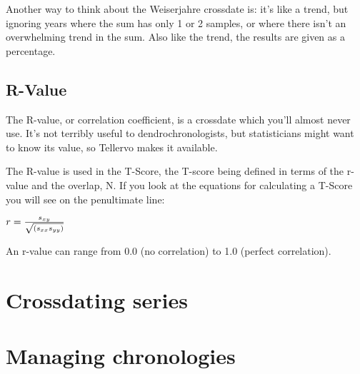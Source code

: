 Another way to think about the Weiserjahre crossdate is: it's like a trend, but ignoring years where the sum has only 1 or 2 samples, or where there isn't an overwhelming trend in the sum. Also like the trend, the results are given as a percentage.


\subsection{R-Value}
The R-value, or correlation coefficient, is a crossdate which you'll almost never use. It's not terribly useful to dendrochronologists, but statisticians might want to know its value, so Tellervo makes it available.

The R-value is used in the T-Score, the T-score being defined in terms of the r-value and the overlap, N. If you look at the equations for calculating a T-Score you will see on the penultimate line: 

\begin{itemize*}
 \item $r = {s_{xy} \over \sqrt{(s_{xx} s_{yy})}}$
\end{itemize*}

An r-value can range from 0.0 (no correlation) to 1.0 (perfect correlation). 
 

\section{Crossdating series}

\section{Managing chronologies}

